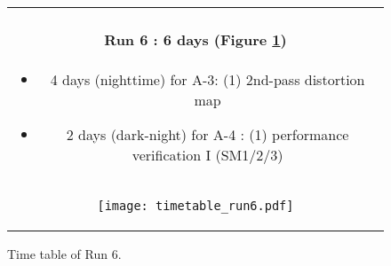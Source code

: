 \begin{figure}[!ht]
\begin{center}
\begin{tabular}{c}
\begin{minipage}{0.95\hsize}
\paragraph{Run 6 : 6 days  (Figure \ref{fig:run6})}
	\begin{itemize}
	\item 4 days (nighttime) for A-3: 
	(1) 2nd-pass distortion map
	\item 2 days (dark-night) for A-4 :
	(1) performance verification I (SM1/2/3)
	\end{itemize}
\end{minipage} \\
\begin{minipage}{0.8\hsize}
	\begin{center}
	\vspace*{5mm}
	\texttt{[image: timetable\_run6.pdf]}
	\end{center}
	\vspace*{-5mm}
	\caption{Time table of Run 6.}
	\label{fig:run6}
\end{minipage}
\end{tabular}
\end{center}
\end{figure}

